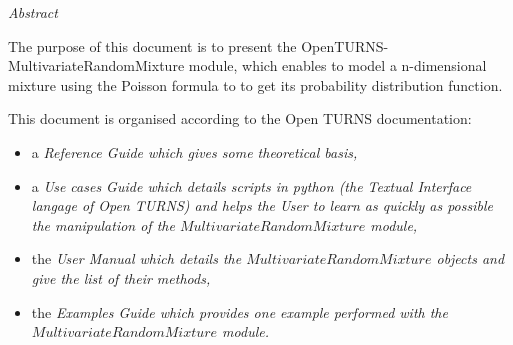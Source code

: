 \vspace{0.5in}
\begin{center}
\vspace{0.3in}
\emph{ Abstract}
\vspace{0.5in}
\end{center}

The purpose of this document is to present the OpenTURNS-MultivariateRandomMixture module, which enables to model a n-dimensional mixture using the 
Poisson formula to to get its probability distribution function.

This document is organised according to the Open TURNS documentation:
\begin{itemize}
\item a \itshape{Reference Guide} which gives some theoretical basis,
\item a \itshape{Use cases Guide} which details scripts in python (the Textual Interface langage of Open TURNS) and helps the User to learn as quickly as possible the manipulation of the $MultivariateRandomMixture$ module,
\item the \itshape{User Manual} which details the $MultivariateRandomMixture$ objects and give the list of their methods,
\item the \itshape{Examples Guide} which provides one example performed with the $MultivariateRandomMixture$ module.
\end{itemize}

